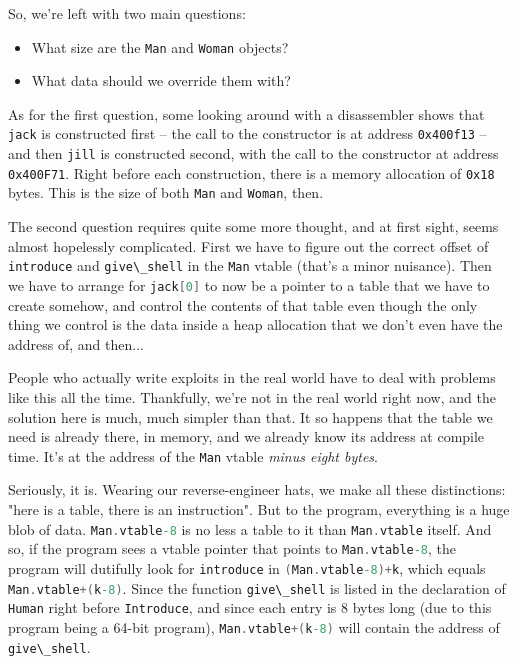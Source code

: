 \documentclass{article}
\newcommand{\xcode}[2]{\colorbox{ubuntuback}{\lstinline[language=#1]|#2|}}
\newcommand{\code}[1]{\colorbox{ubuntuback}{\texttt{#1}}}
\begin{document}
So, we're left with two main questions:
\begin{itemize}
    \item What size are the \xcode{C}{Man} and \xcode{C}{Woman} objects?
    \item What data should we override them with?
\end{itemize}

As for the first question, some looking around with a disassembler shows that \xcode{C}{jack} is constructed first -- the call to the constructor is at address \code{0x400f13} -- and then \xcode{C}{jill} is constructed second, with the call to the constructor at address \code{0x400F71}. Right before each construction, there is a memory allocation of \code{0x18} bytes. This is the size of both \xcode{C}{Man} and \xcode{C}{Woman}, then.

The second question requires quite some more thought, and at first sight, seems almost hopelessly complicated. First we have to figure out the correct offset of \xcode{C}{introduce} and \xcode{C}{give\_shell} in the \xcode{C}{Man} vtable (that's a minor nuisance). Then we have to arrange for \xcode{C}{jack[0]} to now be a pointer to a table that we have to create somehow, and control the contents of that table even though the only thing we control is the data inside a heap allocation that we don't even have the address of, and then...

People who actually write exploits in the real world have to deal with problems like this all the time. Thankfully, we're not in the real world right now, and the solution here is much, much simpler than that. It so happens that the table we need is already there, in memory, and we already know its address at compile time. It's at the address of the \xcode{C}{Man} vtable \textit{minus eight bytes}.

Seriously, it is. Wearing our reverse-engineer hats, we make all these distinctions: "here is a table, there is an instruction". But to the program, everything is a huge blob of data. \xcode{C}{Man.vtable-8} is no less a table to it than \xcode{C}{Man.vtable} itself. And so, if the program sees a vtable pointer that points to \xcode{C}{Man.vtable-8}, the program will dutifully look for \xcode{C}{introduce} in \xcode{C}{(Man.vtable-8)+k}, which equals \xcode{C}{Man.vtable+(k-8)}. Since the function \xcode{C}{give\_shell} is listed in the declaration of \xcode{C}{Human} right before \xcode{C}{Introduce}, and since each entry is 8 bytes long (due to this program being a 64-bit program), \xcode{C}{Man.vtable+(k-8)} will contain the address of \xcode{C}{give\_shell}.
\end{document}
